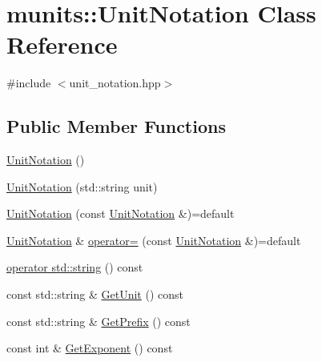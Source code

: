 \hypertarget{classmunits_1_1_unit_notation}{}\section{munits\+:\+:Unit\+Notation Class Reference}
\label{classmunits_1_1_unit_notation}


{\ttfamily \#include $<$unit\+\_\+notation.\+hpp$>$}

\subsection*{Public Member Functions}
\begin{DoxyCompactItemize}
\item 
\hyperlink{classmunits_1_1_unit_notation_a9ae99972c9d065feb0805e6ddf0aa5e8}{Unit\+Notation} ()
\item 
\hyperlink{classmunits_1_1_unit_notation_a1e2eebf9c54bb96b33681d820b69e255}{Unit\+Notation} (std\+::string unit)
\item 
\hyperlink{classmunits_1_1_unit_notation_acd2e3877ef117b186e2f4449f0535508}{Unit\+Notation} (const \hyperlink{classmunits_1_1_unit_notation}{Unit\+Notation} \&)=default
\item 
\hyperlink{classmunits_1_1_unit_notation}{Unit\+Notation} \& \hyperlink{classmunits_1_1_unit_notation_ad83d0b7015d75c6590480013f680cac1}{operator=} (const \hyperlink{classmunits_1_1_unit_notation}{Unit\+Notation} \&)=default
\item 
\hyperlink{classmunits_1_1_unit_notation_aec1bc9ceb4421d38c567fc1f5a57f8ad}{operator std\+::string} () const
\item 
const std\+::string \& \hyperlink{classmunits_1_1_unit_notation_a58b244382181c4757ef942c0b9478199}{Get\+Unit} () const
\item 
const std\+::string \& \hyperlink{classmunits_1_1_unit_notation_a8e1b0087ea3145db70dd59501a74aaad}{Get\+Prefix} () const
\item 
const int \& \hyperlink{classmunits_1_1_unit_notation_a2a567fa1f19879addce7afd4116d02aa}{Get\+Exponent} () const
\end{DoxyCompactItemize}
